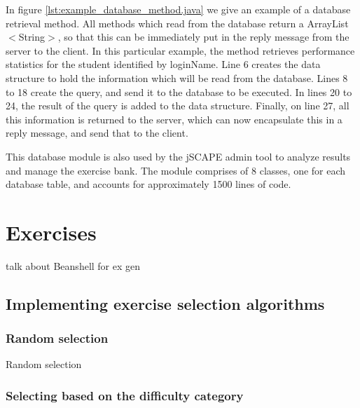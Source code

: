 In figure \ref{lst:example_database_method.java} we give an example of a database retrieval method. All methods which read from the database return a \textsf{ArrayList$<$String$>$}, so that this can be immediately put in the reply message from the server to the client. In this particular example, the method retrieves performance statistics for the student identified by \textsf{loginName}. Line 6 creates the data structure to hold the information which will be read from the database. Lines 8 to 18 create the query, and send it to the database to be executed. In lines 20 to 24, the result of the query is added to the data structure. Finally, on line 27, all this information is returned to the server, which can now encapsulate this in a reply message, and send that to the client. \newline

This database module is also used by the jSCAPE admin tool to analyze results and manage the exercise bank. The module comprises of 8 classes, one for each database table, and accounts for approximately 1500 lines of code.
\section{Exercises}
talk about Beanshell for ex gen

\subsection{Implementing exercise selection algorithms}

\subsubsection{Random selection}
Random selection

\subsubsection{Selecting based on the difficulty category}

